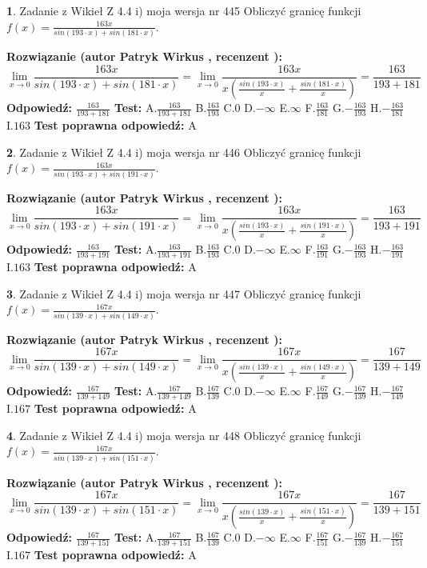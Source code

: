 \documentclass[12pt, a4paper]{article}
\theoremstyle{definition} %
\newtheorem{zad}{}
\newcommand{\zadStart}[1]{\begin{zad}#1\newline}
\newcommand{\zadStop}{\end{zad}}
\newcommand{\rozwStart}[2]{\noindent \textbf{Rozwiązanie (autor #1 , recenzent #2): }\newline}
\newcommand{\rozwStop}{\newline}
\newcommand{\odpStart}{\noindent \textbf{Odpowiedź:}\newline}
\newcommand{\odpStop}{\newline}
\newcommand{\testStart}{\noindent \textbf{Test:}\newline}
\newcommand{\testStop}{\newline}
\newcommand{\kluczStart}{\noindent \textbf{Test poprawna odpowiedź:}\newline}
\newcommand{\kluczStop}{\newline}
\begin{document}
\zadStart{Zadanie z Wikieł Z 4.4 i) moja wersja nr 445}
Obliczyć granicę funkcji $f(x)=\frac{163x}{sin(193\cdot x) +sin(181\cdot x)}$.
\zadStop
\rozwStart{Patryk Wirkus}{}
$$\lim\limits_{x\to 0}\frac{163x}{sin(193\cdot x) +sin(181\cdot x)}=\lim\limits_{x\to 0}\frac{163x}{x(\frac{sin(193\cdot x)}{x}+\frac{sin(181\cdot x)}{x})}=\frac{163}{193+181}$$
\rozwStop
\odpStart
$\frac{163}{193+181}$
\odpStop
\testStart
A.$\frac{163}{193+181}$
B.$\frac{163}{193}$
C.$0$
D.$-\infty$
E.$\infty$
F.$\frac{163}{181}$
G.$-\frac{163}{193}$
H.$-\frac{163}{181}$
I.$163$
\testStop
\kluczStart
A
\kluczStop



\zadStart{Zadanie z Wikieł Z 4.4 i) moja wersja nr 446}
Obliczyć granicę funkcji $f(x)=\frac{163x}{sin(193\cdot x) +sin(191\cdot x)}$.
\zadStop
\rozwStart{Patryk Wirkus}{}
$$\lim\limits_{x\to 0}\frac{163x}{sin(193\cdot x) +sin(191\cdot x)}=\lim\limits_{x\to 0}\frac{163x}{x(\frac{sin(193\cdot x)}{x}+\frac{sin(191\cdot x)}{x})}=\frac{163}{193+191}$$
\rozwStop
\odpStart
$\frac{163}{193+191}$
\odpStop
\testStart
A.$\frac{163}{193+191}$
B.$\frac{163}{193}$
C.$0$
D.$-\infty$
E.$\infty$
F.$\frac{163}{191}$
G.$-\frac{163}{193}$
H.$-\frac{163}{191}$
I.$163$
\testStop
\kluczStart
A
\kluczStop



\zadStart{Zadanie z Wikieł Z 4.4 i) moja wersja nr 447}
Obliczyć granicę funkcji $f(x)=\frac{167x}{sin(139\cdot x) +sin(149\cdot x)}$.
\zadStop
\rozwStart{Patryk Wirkus}{}
$$\lim\limits_{x\to 0}\frac{167x}{sin(139\cdot x) +sin(149\cdot x)}=\lim\limits_{x\to 0}\frac{167x}{x(\frac{sin(139\cdot x)}{x}+\frac{sin(149\cdot x)}{x})}=\frac{167}{139+149}$$
\rozwStop
\odpStart
$\frac{167}{139+149}$
\odpStop
\testStart
A.$\frac{167}{139+149}$
B.$\frac{167}{139}$
C.$0$
D.$-\infty$
E.$\infty$
F.$\frac{167}{149}$
G.$-\frac{167}{139}$
H.$-\frac{167}{149}$
I.$167$
\testStop
\kluczStart
A
\kluczStop



\zadStart{Zadanie z Wikieł Z 4.4 i) moja wersja nr 448}
Obliczyć granicę funkcji $f(x)=\frac{167x}{sin(139\cdot x) +sin(151\cdot x)}$.
\zadStop
\rozwStart{Patryk Wirkus}{}
$$\lim\limits_{x\to 0}\frac{167x}{sin(139\cdot x) +sin(151\cdot x)}=\lim\limits_{x\to 0}\frac{167x}{x(\frac{sin(139\cdot x)}{x}+\frac{sin(151\cdot x)}{x})}=\frac{167}{139+151}$$
\rozwStop
\odpStart
$\frac{167}{139+151}$
\odpStop
\testStart
A.$\frac{167}{139+151}$
B.$\frac{167}{139}$
C.$0$
D.$-\infty$
E.$\infty$
F.$\frac{167}{151}$
G.$-\frac{167}{139}$
H.$-\frac{167}{151}$
I.$167$
\testStop
\kluczStart
A
\kluczStop
\end{document}
